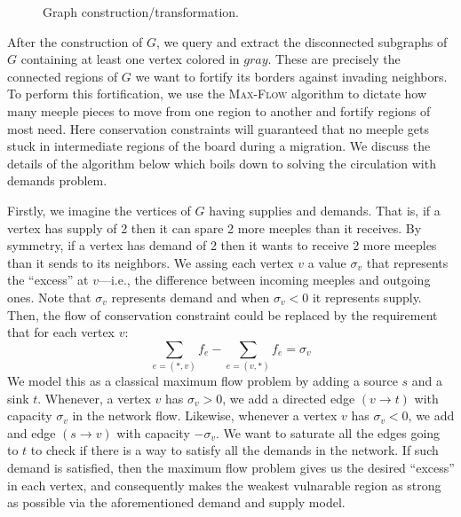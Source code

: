 \documentclass[10pt, letterpaper]{article}
\begin{document}
\begin{enumerate}[label={\bfseries Q\arabic*.}]
\begin{figure}[H]
      \caption{Graph construction/transformation.}
      \label{fig:plot}
    \end{figure}

    After the construction of $G$, we query and extract the disconnected subgraphs of $G$ containing
    at least one vertex colored in $gray$. These are precisely the connected regions of $G$ we want
    to fortify its borders against invading neighbors. To perform this fortification, we use the
    \textsc{Max-Flow} algorithm to dictate how many meeple pieces to move from one region to another
    and fortify regions of most need. Here conservation constraints will guaranteed that no meeple gets
    stuck in intermediate regions of the board during a migration. We discuss the details of the algorithm
    below which boils down to solving the circulation with demands problem.

    Firstly, we imagine the vertices of $G$ having supplies and demands. That is, if a vertex has supply
    of 2 then it can spare 2 more meeples than it receives. By symmetry, if a vertex has demand of 2 then
    it wants to receive 2 more meeples than it sends to its neighbors. We assing each vertex $v$ a value
    $\sigma_v$ that represents the ``excess'' at $v$---i.e., the difference between incoming meeples and
    outgoing ones. Note that $\sigma_v$ represents demand and when $\sigma_v < 0$ it represents supply.
    Then, the flow of conservation constraint could be replaced by the requirement that for each vertex
    $v$:
    \[
      \sum_{e=(*,v)} f_e - \sum_{e=(v,*)} f_e = \sigma_v
    \]
    We model this as a classical maximum flow problem by adding a source $s$ and a sink $t$. Whenever,
    a vertex $v$ has $\sigma_v > 0$, we add a directed edge $(v \rightarrow t)$ with capacity $\sigma_v$
    in the network flow. Likewise, whenever a vertex $v$ has $\sigma_v < 0$, we add and edge $(s \rightarrow
    v)$ with capacity $-\sigma_v$. We want to saturate all the edges going to $t$ to check if there is
    a way to satisfy all the demands in the network. If such demand is satisfied, then the maximum flow
    problem gives us the desired ``excess'' in each vertex, and consequently makes the weakest vulnarable
    region as strong as possible via the aforementioned demand and supply model.


\end{enumerate}
\end{document}
